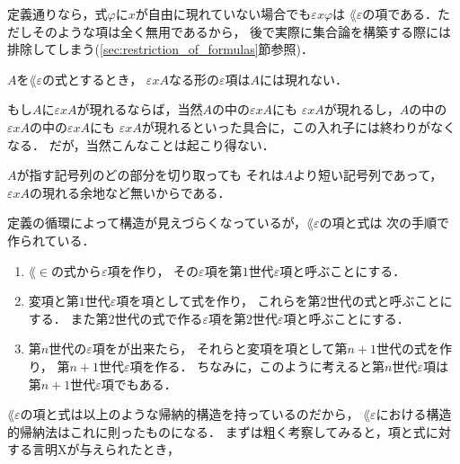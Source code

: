 	定義通りなら，式$\varphi$に$x$が自由に現れていない場合でも$\varepsilon x \varphi$は
	$\lang{\varepsilon}$の項である．ただしそのような項は全く無用であるから，
	後で実際に集合論を構築する際には排除してしまう(\ref{sec:restriction_of_formulas}節参照)．
	
	\begin{screen}
		\begin{metathm}
			$A$を$\lang{\varepsilon}$の式とするとき，
			$\varepsilon x A$なる形の$\varepsilon$項は$A$には現れない．
		\end{metathm}
	\end{screen}
	
	もし$A$に$\varepsilon x A$が現れるならば，当然$A$の中の$\varepsilon x A$にも
	$\varepsilon x A$が現れるし，$A$の中の$\varepsilon x A$の中の$\varepsilon x A$にも
	$\varepsilon x A$が現れるといった具合に，この入れ子には終わりがなくなる．
	だが，当然こんなことは起こり得ない．
	
	\begin{metaprf}
		$A$が指す記号列のどの部分を切り取っても
		それは$A$より短い記号列であって，$\varepsilon x A$の現れる余地など無いからである．
		\QED
	\end{metaprf}
	
	定義の循環によって構造が見えづらくなっているが，$\lang{\varepsilon}$の項と式は
	次の手順で作られている．
	
	\begin{enumerate}
		\item $\lang{\in}$の式から$\varepsilon$項を作り，
			その$\varepsilon$項を第$1$世代$\varepsilon$項と呼ぶことにする．
		\item 変項と第$1$世代$\varepsilon$項を項として式を作り，
			これらを第$2$世代の式と呼ぶことにする．
			また第$2$世代の式で作る$\varepsilon$項を第$2$世代$\varepsilon$項と呼ぶことにする．
		\item 第$n$世代の$\varepsilon$項をが出来たら，
			それらと変項を項として第$n+1$世代の式を作り，
			第$n+1$世代$\varepsilon$項を作る．
			ちなみに，このように考えると第$n$世代$\varepsilon$項は
			第$n+1$世代$\varepsilon$項でもある．
	\end{enumerate}
	
	$\lang{\varepsilon}$の項と式は以上のような帰納的構造を持っているのだから，
	$\lang{\varepsilon}$における構造的帰納法はこれに則ったものになる．
	まずは粗く考察してみると，項と式に対する言明Xが与えられたとき，
	

